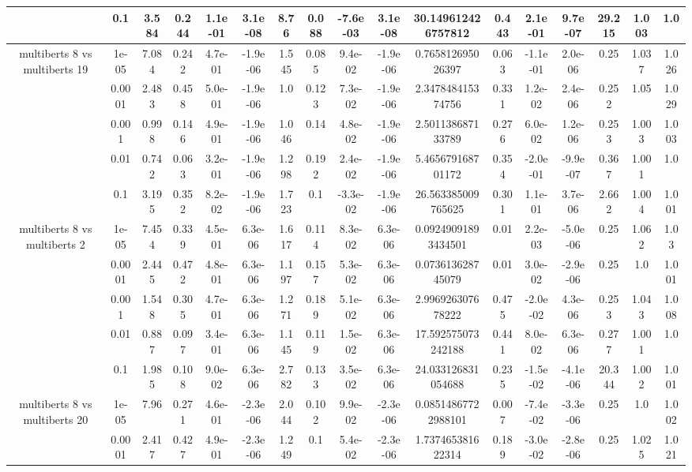 \begin{tabular}{|c|c|c|c|c|c|c|c|c|c|c|c|c|c|c|c|c|}
 & 0.1 & 3.584 & 0.244 & 1.1e-01 & 3.1e-08 & 8.76 & 0.088 & -7.6e-03 & 3.1e-08 & 30.149612426757812 & 0.443 & 2.1e-01 & 9.7e-07 & 29.215 & 1.003 & 1.0 \\
\hline
\multirow{5}{*}{multiberts 8 vs multiberts 19} & 1e-05 & 7.084 & 0.242 & 4.7e-01 & -1.9e-06 & 1.545 & 0.085 & 9.4e-02 & -1.9e-06 & 0.765812695026397 & 0.063 & -1.1e-01 & 2.0e-06 & 0.25 & 1.037 & 1.026 \\
 & 0.0001 & 2.483 & 0.458 & 5.0e-01 & -1.9e-06 & 1.0 & 0.123 & 7.3e-02 & -1.9e-06 & 2.347848415374756 & 0.331 & 1.2e-02 & 2.4e-06 & 0.252 & 1.05 & 1.029 \\
 & 0.001 & 0.998 & 0.146 & 4.9e-01 & -1.9e-06 & 1.046 & 0.14 & 4.8e-02 & -1.9e-06 & 2.501138687133789 & 0.276 & 6.0e-02 & 1.2e-06 & 0.253 & 1.003 & 1.003 \\
 & 0.01 & 0.742 & 0.063 & 3.2e-01 & -1.9e-06 & 1.298 & 0.192 & 2.4e-02 & -1.9e-06 & 5.465679168701172 & 0.354 & -2.0e-01 & -9.9e-07 & 0.367 & 1.001 & 1.0 \\
 & 0.1 & 3.195 & 0.352 & 8.2e-02 & -1.9e-06 & 1.723 & 0.1 & -3.3e-02 & -1.9e-06 & 26.563385009765625 & 0.301 & 1.1e-01 & 3.7e-06 & 2.662 & 1.004 & 1.001 \\
\hline
\multirow{5}{*}{multiberts 8 vs multiberts 2} & 1e-05 & 7.454 & 0.339 & 4.5e-01 & 6.3e-06 & 1.617 & 0.114 & 8.3e-02 & 6.3e-06 & 0.09249091893434501 & 0.01 & 2.2e-03 & -5.0e-06 & 0.25 & 1.062 & 1.03 \\
 & 0.0001 & 2.445 & 0.472 & 4.8e-01 & 6.3e-06 & 1.197 & 0.157 & 5.3e-02 & 6.3e-06 & 0.073613628745079 & 0.01 & 3.0e-02 & -2.9e-06 & 0.25 & 1.0 & 1.001 \\
 & 0.001 & 1.548 & 0.305 & 4.7e-01 & 6.3e-06 & 1.271 & 0.189 & 5.1e-02 & 6.3e-06 & 2.996926307678222 & 0.475 & -2.0e-02 & 4.3e-06 & 0.253 & 1.043 & 1.008 \\
 & 0.01 & 0.887 & 0.097 & 3.4e-01 & 6.3e-06 & 1.145 & 0.119 & 1.5e-02 & 6.3e-06 & 17.592575073242188 & 0.441 & 8.0e-02 & 6.3e-06 & 0.277 & 1.001 & 1.0 \\
 & 0.1 & 1.985 & 0.108 & 9.0e-02 & 6.3e-06 & 2.782 & 0.133 & 3.5e-02 & 6.3e-06 & 24.033126831054688 & 0.235 & -1.5e-02 & -4.1e-06 & 20.344 & 1.002 & 1.001 \\
\hline
\multirow{5}{*}{multiberts 8 vs multiberts 20} & 1e-05 & 7.96 & 0.271 & 4.6e-01 & -2.3e-06 & 2.044 & 0.102 & 9.9e-02 & -2.3e-06 & 0.08514867722988101 & 0.007 & -7.4e-02 & -3.3e-06 & 0.25 & 1.0 & 1.002 \\
 & 0.0001 & 2.417 & 0.427 & 4.9e-01 & -2.3e-06 & 1.249 & 0.1 & 5.4e-02 & -2.3e-06 & 1.737465381622314 & 0.189 & -3.0e-02 & -2.8e-06 & 0.25 & 1.025 & 1.021 \\

\end{tabular}
